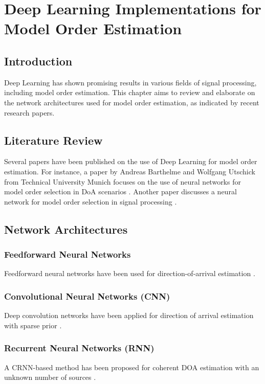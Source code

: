 \chapter{Deep Learning Implementations for Model Order Estimation}

\section{Introduction}
Deep Learning has shown promising results in various fields of signal processing, including model order estimation.
This chapter aims to review and elaborate on the network architectures used for model order estimation, as indicated
by recent research papers.

\section{Literature Review}
Several papers have been published on the use of Deep Learning for model order estimation. For instance, a paper by
Andreas Barthelme and Wolfgang Utschick from Technical University Munich focuses on the use of neural networks for
model order selection in DoA scenarios \cite{barthelme2020}. Another paper discusses a neural network for model order
selection in signal processing \cite{Costa1995}.

\section{Network Architectures}
\subsection{Feedforward Neural Networks}
Feedforward neural networks have been used for direction-of-arrival estimation \cite{Ozanich2020}.

\subsection{Convolutional Neural Networks (CNN)}
Deep convolution networks have been applied for direction of arrival estimation with sparse prior \cite{Wu2019}.

\subsection{Recurrent Neural Networks (RNN)}
A CRNN-based method has been proposed for coherent DOA estimation with an unknown number of sources \cite{Yao2020}.

